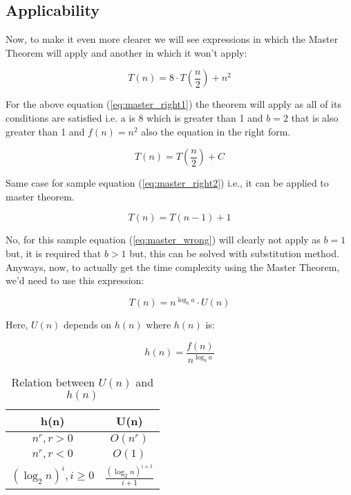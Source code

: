 \documentclass[a4paper,12pt]{article}
\theoremstyle{definition}
\begin{document}
    \subsection{Applicability}

    \noindent
    Now, to make it even more clearer we will see expressions in which the Master Theorem will apply and another
    in which it won't apply:

    \begin{equation}
        \label{eq:master_right1}
        T(n) = 8 \cdot T\left(\frac{n}{2}\right) + n^2
    \end{equation}

    \noindent
    For the above equation (\ref{eq:master_right1}) the theorem will apply as all of its conditions are satisfied
    i.e. a is 8 which is greater than 1 and $b = 2$ that is also greater than 1 and $f(n) = n^2$
    also the equation in the right form.

    \begin{equation}
        \label{eq:master_right2}
        T(n) = T\left(\frac{n}{2}\right) + C
    \end{equation}

    \noindent
    Same case for sample equation (\ref{eq:master_right2}) i.e., it can be applied to master theorem.

    \begin{equation}
        \label{eq:master_wrong}
        T(n) = T(n - 1) + 1
    \end{equation}

    \noindent
    No, for this sample equation (\ref{eq:master_wrong}) will clearly not apply as $b = 1$ but, it is required
    that $b > 1$ but, this can be solved with substitution method.
    Anyways, now, to actually get the time complexity using the Master Theorem, we'd need to use this expression:

    \begin{equation*}
        T(n) = n^{\log_b a} \cdot U(n)
    \end{equation*}

    \noindent
    Here, $U(n)$ depends on $h(n)$ where $h(n)$ is:

    \begin{equation*}
        h(n) = \frac{f(n)}{n^{\log_b a}}
    \end{equation*}

    \begin{table}[!hbt]
        \centering
        \caption{Relation between $U(n)$ and $h(n)$}
        \label{tab:hnu}
        \begin{tabular}{|c|c|}
            \hline \textbf{h(n)}            & \textbf{U(n)}                    \\
            \hline $n^r, r > 0$             & $O(n^r)$                         \\
            \hline $n^r, r < 0$             & $O(1)$                           \\
            \hline $(\log_2 n)^i, i \geq 0$ & $\frac{(\log_2 n)^{i+1}}{i + 1}$ \\
            \hline
        \end{tabular}
    \end{table}
\end{document}

